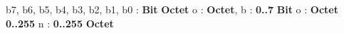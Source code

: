 \begin{algorithme}
    {b7, b6, b5, b4, b3, b2, b1, b0 : \textbf{Bit}}
    {\textbf{Octet}}
    {}
    {o : \textbf{Octet}, b : \textbf{0..7}}
    {\textbf{Bit}}
    {}
    {o : \textbf{Octet}}
    {\textbf{0..255}}
    {}
    {n : \textbf{0..255}}
    {\textbf{Octet}}
    {}
\end{algorithme}
